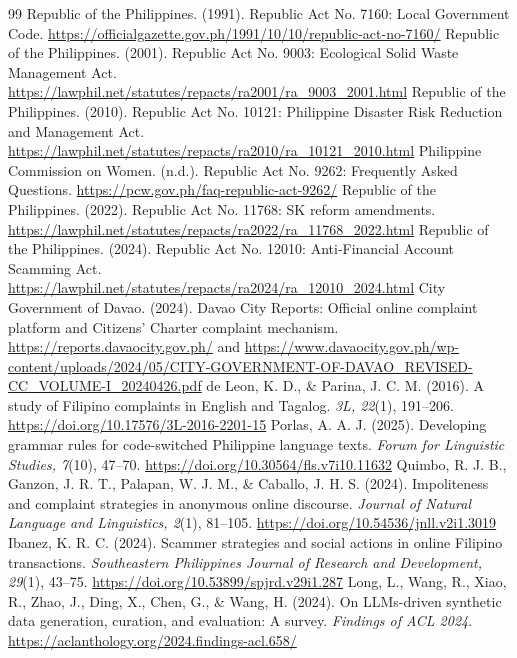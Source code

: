 \begin{thebibliography}{99}
 Republic of the Philippines. (1991). Republic Act No. 7160: Local Government Code. \url{https://officialgazette.gov.ph/1991/10/10/republic-act-no-7160/}
 Republic of the Philippines. (2001). Republic Act No. 9003: Ecological Solid Waste Management Act. \url{https://lawphil.net/statutes/repacts/ra2001/ra_9003_2001.html}
 Republic of the Philippines. (2010). Republic Act No. 10121: Philippine Disaster Risk Reduction and Management Act. \url{https://lawphil.net/statutes/repacts/ra2010/ra_10121_2010.html}
 Philippine Commission on Women. (n.d.). Republic Act No. 9262: Frequently Asked Questions. \url{https://pcw.gov.ph/faq-republic-act-9262/}
 Republic of the Philippines. (2022). Republic Act No. 11768: SK reform amendments. \url{https://lawphil.net/statutes/repacts/ra2022/ra_11768_2022.html}
 Republic of the Philippines. (2024). Republic Act No. 12010: Anti-Financial Account Scamming Act. \url{https://lawphil.net/statutes/repacts/ra2024/ra_12010_2024.html}
 City Government of Davao. (2024). Davao City Reports: Official online complaint platform and Citizens' Charter complaint mechanism. \url{https://reports.davaocity.gov.ph/} and \url{https://www.davaocity.gov.ph/wp-content/uploads/2024/05/CITY-GOVERNMENT-OF-DAVAO_REVISED-CC_VOLUME-I_20240426.pdf}
 de Leon, K. D., \& Parina, J. C. M. (2016). A study of Filipino complaints in English and Tagalog. \textit{3L, 22}(1), 191--206. \url{https://doi.org/10.17576/3L-2016-2201-15}
 Porlas, A. A. J. (2025). Developing grammar rules for code-switched Philippine language texts. \textit{Forum for Linguistic Studies, 7}(10), 47--70. \url{https://doi.org/10.30564/fls.v7i10.11632}
 Quimbo, R. J. B., Ganzon, J. R. T., Palapan, W. J. M., \& Caballo, J. H. S. (2024). Impoliteness and complaint strategies in anonymous online discourse. \textit{Journal of Natural Language and Linguistics, 2}(1), 81--105. \url{https://doi.org/10.54536/jnll.v2i1.3019}
 Ibanez, K. R. C. (2024). Scammer strategies and social actions in online Filipino transactions. \textit{Southeastern Philippines Journal of Research and Development, 29}(1), 43--75. \url{https://doi.org/10.53899/spjrd.v29i1.287}
 Long, L., Wang, R., Xiao, R., Zhao, J., Ding, X., Chen, G., \& Wang, H. (2024). On LLMs-driven synthetic data generation, curation, and evaluation: A survey. \textit{Findings of ACL 2024}. \url{https://aclanthology.org/2024.findings-acl.658/}

\end{thebibliography}
